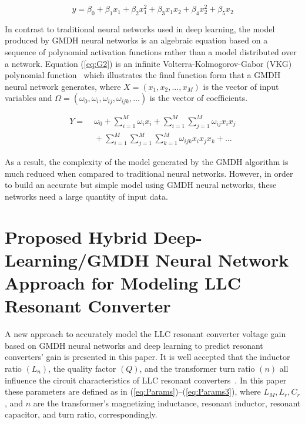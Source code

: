 \documentclass{article} %
\begin{document}
\begin{equation}
y = \beta_{0} + \beta_{1}x_{1} + \beta_{2}x_{1}^2 + \beta_{3}x_{1}x_{2} + \beta_{4}x_{2}^2 + \beta_{5}x_{2}
\label{eq:G}
\end{equation}

In contrast to traditional neural networks used in deep learning, the model produced by GMDH neural networks is an algebraic equation based on a sequence of polynomial activation functions rather than a model distributed over a network. Equation (\ref{eq:G2}) is an infinite Volterra-Kolmogorov-Gabor (VKG) polynomial function~\cite{pukish2015polynet} which illustrates the final function form that a GMDH neural network generates, where $X=(x_{1},x_{2},...,x_{M})$ is the vector of input variables and $\Omega=(\omega_{0},\omega_{i},\omega_{ij},\omega_{ijk},...)$ is the vector of coefficients.

\begin{equation}
\begin{aligned}
Y =&\; \omega_{0} 
     + \sum_{i=1}^{M}\omega_{i}x_{i}
     + \sum_{i=1}^{M}\sum_{j=1}^{M}\omega_{ij}x_{i}x_{j} \\
   &\; + \sum_{i=1}^{M}\sum_{j=1}^{M}\sum_{k=1}^{M}\omega_{ijk}x_{i}x_{j}x_{k} + \dots
\end{aligned}
\label{eq:G2}
\end{equation}

As a result, the complexity of the model generated by the GMDH algorithm is much reduced when compared to traditional neural networks. However, in order to build an accurate but simple model using GMDH neural networks, these networks need a large quantity of input data.

\section{Proposed Hybrid Deep-Learning/GMDH Neural Network Approach for Modeling LLC Resonant Converter}

A new approach to accurately model the LLC resonant converter voltage gain based on GMDH neural networks and deep learning to predict resonant converters' gain is presented in this paper. 
It is well accepted that the inductor ratio $(L_{n})$, the quality factor $(Q)$, and the transformer turn ratio $(n)$ all influence the circuit characteristics of LLC resonant converters~\cite{Wei2019,Wei2019b}. 
In this paper these parameters are defined as in (\ref{eq:Params})--(\ref{eq:Params3}), where $L_{M}, L_{r}, C_{r}$, and $n$ are the transformer's magnetizing inductance, resonant inductor, resonant capacitor, and turn ratio, correspondingly.
\end{document}

